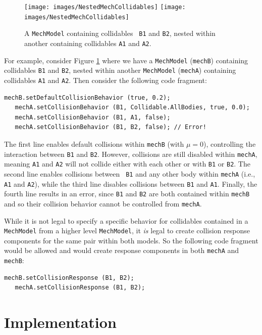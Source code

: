 \begin{figure}[ht]
\begin{center}
 \iflatexml
   \texttt{[image: images/NestedMechCollidables]}
 \else
   \texttt{[image: images/NestedMechCollidables]}
 \fi
\end{center}
\caption{A {\tt MechModel} containing collidables {\tt
B1} and {\tt B2}, nested within another
containing collidables {\tt A1} and {\tt A2}.}
\label{NestedMechCollidables:fig}
\end{figure}

For example, consider Figure \ref{NestedMechCollidables:fig} where we
have a {\tt MechModel} ({\tt mechB}) containing collidables {\tt B1} and
{\tt B2}, nested within another {\tt MechModel} ({\tt mechA})
containing collidables {\tt A1} and {\tt A2}. Then consider the
following code fragment:
%
\begin{lstlisting}[]
   mechB.setDefaultCollisionBehavior (true, 0.2);
   mechA.setCollisionBehavior (B1, Collidable.AllBodies, true, 0.0);
   mechA.setCollisionBehavior (B1, A1, false);
   mechA.setCollisionBehavior (B1, B2, false); // Error!
\end{lstlisting}
%
The first line enables default collisions within {\tt mechB} (with
$\mu = 0$), controlling the interaction between {\tt B1} and {\tt B2}.
However, collisions are still disabled within {\tt mechA}, meaning
{\tt A1} and {\tt A2} will not collide either with each other or with
{\tt B1} or {\tt B2}.  The second line enables collisions between {\tt
B1} and any other body within {\tt mechA} (i.e., {\tt A1} and
{\tt A2}), while the third line disables collisions between {\tt B1}
and {\tt A1}.  Finally, the fourth line results in an error, since
{\tt B1} and {\tt B2} are both contained within {\tt mechB} and so
their collision behavior cannot be controlled from {\tt mechA}.

While it is not legal to specify a specific behavior for collidables
contained in a {\tt MechModel} from a higher level {\tt MechModel},
it {\it is} legal to create collision response components for the same
pair within both models. So the following code fragment would be
allowed and would create response components in both {\tt mechA} and
{\tt mechB}:
%
\begin{lstlisting}[]
   mechB.setCollisionResponse (B1, B2);
   mechA.setCollisionResponse (B1, B2);
\end{lstlisting}
%

\section{Implementation}
\label{CollisionImplementation:sec}

